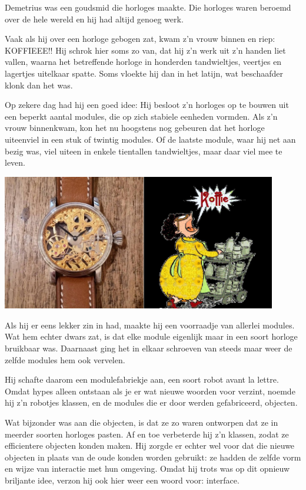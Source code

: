 \documentclass[a4paper,11pt]{article}
\begin{document}
\begin{framed}
Demetrius was een goudsmid die horloges maakte.
Die horloges waren beroemd over de hele wereld en hij had altijd genoeg werk.

Vaak als hij over een horloge gebogen zat, kwam z'n vrouw binnen en riep: KOFFIEEE!!
Hij schrok hier soms zo van, dat hij z'n werk uit z'n handen liet vallen,
waarna het betreffende horloge in honderden tandwieltjes, veertjes en lagertjes uitelkaar spatte.
Soms vloekte hij dan in het latijn, wat beschaafder klonk dan het was.

Op zekere dag had hij een goed idee:
Hij besloot z'n horloges op te bouwen uit een beperkt aantal modules, die op zich stabiele eenheden vormden.
Als z'n vrouw binnenkwam, kon het nu hoogstens nog gebeuren dat het horloge uiteenviel in een stuk of twintig modules.
Of de laatste module, waar hij net aan bezig was, viel uiteen in enkele tientallen tandwieltjes, maar daar viel mee te leven.

\includegraphics[width=12cm]{horloge_koffie}

Als hij er eens lekker zin in had, maakte hij een voorraadje van allerlei modules.
Wat hem echter dwars zat, is dat elke module eigenlijk maar in een soort horloge bruikbaar was.
Daarnaast ging het in elkaar schroeven van steeds maar weer de zelfde modules hem ook vervelen.

Hij schafte daarom een modulefabriekje aan, een soort robot avant la lettre.
Omdat hypes alleen ontstaan als je er wat nieuwe woorden voor verzint,
noemde hij z'n robotjes klassen, en de modules die er door werden gefabriceerd, objecten.

Wat bijzonder was aan die objecten, is dat ze zo waren ontworpen dat ze in meerder soorten horloges pasten.
Af en toe verbeterde hij z'n klassen, zodat ze efficientere objecten konden maken.
Hij zorgde er echter wel voor dat die nieuwe objecten in plaats van de oude konden worden gebruikt:
ze hadden de zelfde vorm en wijze van interactie met hun omgeving.
Omdat hij trots was op dit opnieuw briljante idee, verzon hij ook hier weer een woord voor: interface.


\end{framed}
\end{document}

